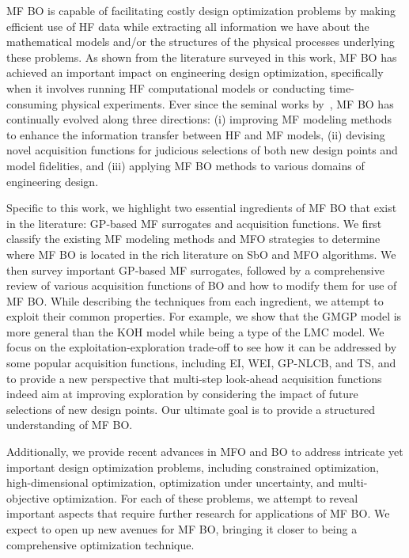 \documentclass[iicol,sn-basic]{sn-jnl}%
\begin{document}
MF BO is capable of facilitating costly design optimization problems by making efficient use of HF data while extracting all information we have about the mathematical models and/or the structures of the physical processes underlying these problems. 
As shown from the literature surveyed in this work, MF BO has achieved an important impact on engineering design optimization, specifically when it involves running HF computational models or conducting time-consuming physical experiments.
Ever since the seminal works by~\cite{Huang2006smo,Forrester2007}, MF BO has continually evolved along three directions: (i) improving MF modeling methods to enhance the information transfer between HF and MF models, (ii) devising novel acquisition functions for judicious selections of both new design points and model fidelities, and (iii) applying MF BO methods to various domains of engineering design.
 
Specific to this work, we highlight two essential ingredients of MF BO that exist in the literature: GP-based MF surrogates and acquisition functions.
We first classify the existing MF modeling methods and MFO strategies to determine where MF BO is located in the rich literature on SbO and MFO algorithms.
We then survey important GP-based MF surrogates, followed by a comprehensive review of various acquisition functions of BO and how to modify them for use of MF BO.  
While describing the techniques from each ingredient, we attempt to exploit their common properties.
For example, we show that the GMGP model is more general than the KOH model while being a type of the LMC model.
We focus on the exploitation-exploration trade-off to see how it can be addressed by some popular acquisition functions, including EI, WEI, GP-NLCB, and TS, and to provide a new perspective that multi-step look-ahead acquisition functions indeed aim at improving exploration by considering the impact of future selections of new design points.  
Our ultimate goal is to provide a structured understanding of MF BO.

Additionally, we provide recent advances in MFO and BO to address intricate yet important design optimization problems, including constrained optimization, high-dimensional optimization, optimization under uncertainty, and multi-objective optimization.
For each of these problems, we attempt to reveal important aspects that require further research for applications of MF BO.
We expect to open up new avenues for MF BO, bringing it closer to being a comprehensive optimization technique.
\end{document}
